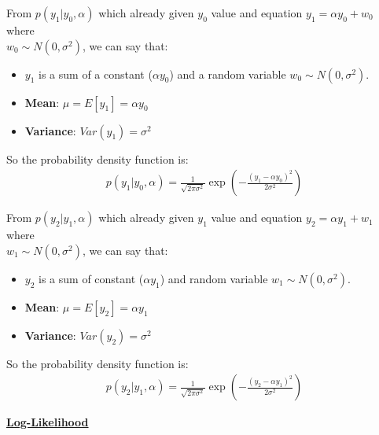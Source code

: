 \documentclass[12pt, a4paper]{article}
\begin{document}
            From $p(y_{1}|y_{0}, \alpha)$ which already given $y_{0}$ value and equation $y_{1} = \alpha y_{0} + w_{0}$ where \\[0.5em]
            $w_{0} \sim N(0, \sigma^{2})$, we can say that:
            \begin{itemize}
                \item $y_{1}$ is a sum of a constant ($\alpha y_{0}$) and a random variable $w_{0} \sim N(0, \sigma^{2})$.
                \item \textbf{Mean}: $\mu = E[y_{1}] = \alpha y_{0}$
                \item \textbf{Variance}: $Var(y_{1}) = \sigma^{2}$
            \end{itemize}

            So the probability density function is:
            \begin{align*}
                p(y_{1}|y_{0}, \alpha) = \frac{1}{\sqrt{2\pi\sigma^{2}}} \exp\left( -\frac{(y_{1} - \alpha y_{0})^{2}}{2\sigma^{2}} \right)
            \end{align*}

            \vspace{1em}

            From $p(y_{2}|y_{1}, \alpha)$ which already given $y_{1}$ value and equation $y_{2} = \alpha y_{1} + w_{1}$ where \\[0.5em]
            $w_{1} \sim N(0, \sigma^{2})$, we can say that:
            \begin{itemize}
                \item $y_{2}$ is a sum of constant ($\alpha y_{1}$) and random variable $w_{1} \sim N(0, \sigma^{2})$.
                \item \textbf{Mean}: $\mu = E[y_{2}] = \alpha y_{1}$
                \item \textbf{Variance}: $Var(y_{2}) = \sigma^{2}$
            \end{itemize}

            So the probability density function is:
            \begin{align*}
                p(y_{2}|y_{1}, \alpha) = \frac{1}{\sqrt{2\pi\sigma^{2}}} \exp\left( -\frac{(y_{2} - \alpha y_{1})^{2}}{2\sigma^{2}} \right)
            \end{align*}

    \pagebreak

            \noindent\underline{\textbf{Log-Likelihood}}
            
            \vspace{1em}
            
\end{document}
